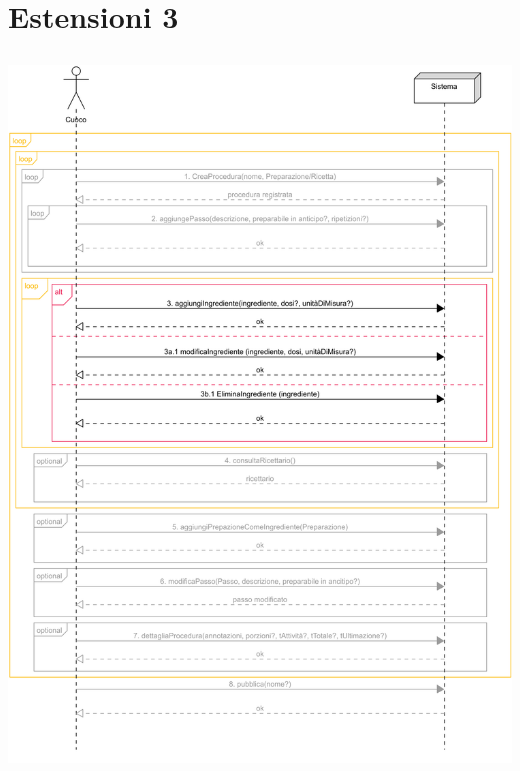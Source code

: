 \section*{Estensioni 3}
\begin{center}
  \includegraphics[max width=\textwidth, max height=190mm]{../resources/img/GRP/SSD/ext3.png}
\end{center}

